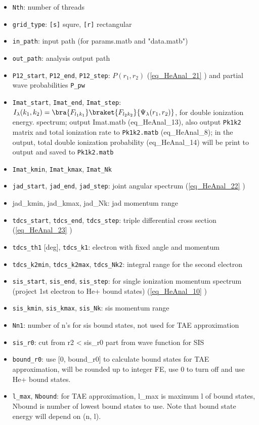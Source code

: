
\begin{itemize}
\item \verb`Nth`: number of threads
\item \verb`grid_type`: \verb`[s]` squre, \verb`[r]` rectangular
\item \verb`in_path`: input path (for params.matb and "data.matb")
\item \verb`out_path`: analysis output path

\item \verb`P12_start`, \verb`P12_end`, \verb`P12_step`: $P(r_1, r_2)$ (\autoref{eq_HeAnal_21} ) and partial wave probabilities \verb`P_pw`

\item \verb`Imat_start`, \verb`Imat_end`, \verb`Imat_step`: $I_\lambda(k_1, k_2) = \bra{F_{l_1k_1}}\braket{F_{l_2k_2}}{\Psi_\lambda(r_1,r_2)}$, for double ionization energy. spectrum; output Imat.matb (eq_HeAnal_13), also output \verb`Pk1k2` matrix and total ionization rate to \verb`Pk1k2.matb` (eq_HeAnal_8); in the output, total double ionization probability (eq_HeAnal_14) will be print to output and saved to \verb`Pk1k2.matb`
\item \verb`Imat_kmin`, \verb`Imat_kmax`, \verb`Imat_Nk`

\item \verb`jad_start`, \verb`jad_end`, \verb`jad_step`: joint angular spectrum (\autoref{eq_HeAnal_22} )
\item jad_kmin, jad_kmax, jad_Nk: jad momentum range

\item \verb`tdcs_start`, \verb`tdcs_end`, \verb`tdcs_step`: triple differential cross section (\autoref{eq_HeAnal_23} )
\item \verb`tdcs_th1` [deg], \verb`tdcs_k1`: electron with fixed angle and momentum
\item \verb`tdcs_k2min`, \verb`tdcs_k2max`, \verb`tdcs_Nk2`: integral range for the second electron

\item \verb`sis_start`, \verb`sis_end`, \verb`sis_step`: for single ionization momentum spectrum (project 1st electron to He+ bound states) (\autoref{eq_HeAnal_10} )
\item \verb`sis_kmin`, \verb`sis_kmax`, \verb`sis_Nk`: sis momentum range
\item \verb`Nn1`: number of n's for sis bound states, not used for TAE approximation
\item \verb`sis_r0`: cut from r2 < sis_r0 part from wave function for SIS
\item \verb`bound_r0`: use [0, bound_r0] to calculate bound states for TAE approximation, will be rounded up to integer FE, use 0 to turn off and use He+ bound states.
\item \verb`l_max`, \verb`Nbound`: for TAE approximation, l_max is maximum l of bound states, Nbound is number of lowest bound states to use. Note that bound state energy will depend on (n, l).


\end{itemize}
